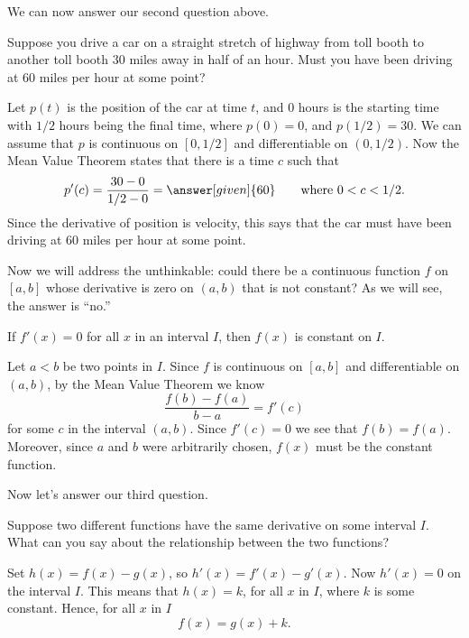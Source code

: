 \documentclass{ximera}
\begin{document}
We can now answer our second question above.  

\begin{example}
	Suppose you drive a car on a straight stretch of highway from toll booth to another toll
	booth $30$ miles away in half of an hour. Must you have been driving
	at $60$ miles per hour at some point?
	
	\begin{explanation}
		Let $p(t)$ is the position of the car at time $t$, and $0$ hours is the
		starting time with $1/2$ hours being the final time, where $p(0)=0$, and $p(1/2)=30$.
		We can assume that $p$ is continuous on $[0,1/2]$ and differentiable on
		$(0,1/2)$. Now the Mean Value Theorem states that there is a time $c$ such that
		\[
		p'(c) = \frac{30-0}{1/2-0} = \answer[given]{60}\qquad \text{where $0<c<1/2$.}
		\]
		Since the derivative of position is velocity, this says that the car
		must have been driving at $60$ miles per hour at some point.
	\end{explanation}
\end{example}

Now we will address the unthinkable: could there be a continuous
function $f$ on $[a,b]$ whose derivative is zero on $(a,b)$ that is
not constant? As we will see, the answer is ``no.''

\begin{theorem} 
	If $f'(x)=0$ for all $x$ in an interval $I$, then $f(x)$ is constant
	on $I$.
	\begin{explanation}
		Let $a< b$ be two points in $I$. Since $f$ is continuous on $[a,b]$
		and differentiable on $(a,b)$, by the Mean Value Theorem we know
		\[
		\frac{f(b)-f(a)}{b-a} = f'(c)
		\]
		for some $c$ in the interval $(a,b)$. Since $f'(c)=0$ we see that
		$f(b)=f(a)$. %
		Moreover, since $a$ and $b$ were arbitrarily chosen,
		$f(x)$ must be the constant function.
	\end{explanation}
\end{theorem}


Now let's answer our third question.

\begin{example}
	Suppose two different functions have the same derivative on some interval $I$. What can you
	say about the relationship between the two functions?
	
	\begin{explanation}
		Set $h(x) = f(x) - g(x)$, so $h'(x) = f'(x) -g'(x)$. Now $h'(x) = 0$
		on the interval $I$. This means that $h(x) = k$, for all $x$ in $I$, where $k$ is some
		constant. Hence, for all $x$ in $I$
		\[
		f(x) = g(x) + k.
		\]
	\end{explanation}
\end{example}
\end{document}
